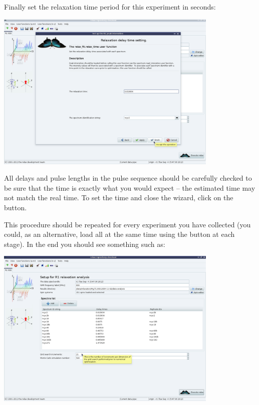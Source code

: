 Finally set the relaxation time period for this experiment in seconds:

\begin{minipage}[h]{\linewidth}
\centerline{\includegraphics[width=0.8\textwidth, bb=14 14 1415 1019]{graphics/screenshots/r1_analysis/peak_intensity_times}}
\end{minipage}

All delays and pulse lengths in the pulse sequence should be carefully checked to be sure that the time is exactly what you would expect -- the estimated time may not match the real time.  To set the time and close the wizard, click on the  button.

This procedure should be repeated for every experiment you have collected (you could, as an alternative, load all at the same time using the  button at each stage).  In the end you should see something such as:

\begin{minipage}[h]{\linewidth}
\centerline{\includegraphics[width=0.8\textwidth, bb=14 14 1415 1019]{graphics/screenshots/r1_analysis/analysis_tab_full}}
\end{minipage}


